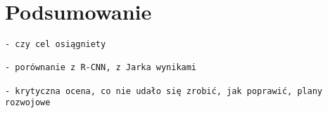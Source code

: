 \chapter{Podsumowanie}

\begin{verbatim}
- czy cel osiągniety

- porównanie z R-CNN, z Jarka wynikami

- krytyczna ocena, co nie udało się zrobić, jak poprawić, plany rozwojowe
\end{verbatim}
